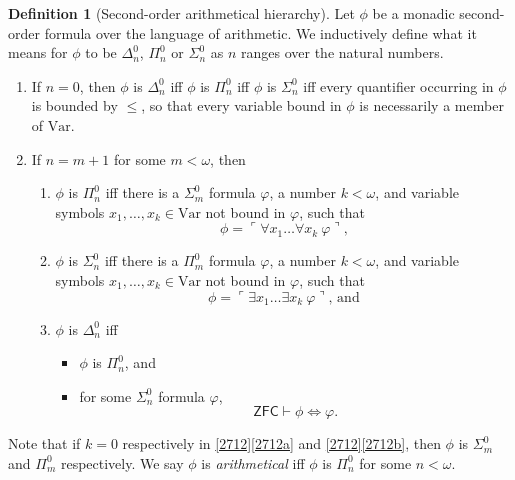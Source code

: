 \documentclass[12pt, twoside]{memoir}
\numberwithin{equation}{section}
\theoremstyle{definition}
\newtheorem{defi}[thm]{Definition}
\theoremstyle{remark}
\theoremstyle{definition}
\theoremstyle{definition}
\theoremstyle{definition}
\theoremstyle{remark}
\begin{document}
\begin{defi}[Second-order arithmetical hierarchy]\label{def2416}
Let $\phi$ be a monadic second-order formula over the language of arithmetic. We inductively define what it means for $\phi$ to be $\Delta^0_n$, $\Pi^0_n$ or $\Sigma^0_n$ as $n$ ranges over the natural numbers.
\begin{enumerate}[label=(\arabic*)]
    \item If $n = 0$, then $\phi$ is $\Delta^0_n$ iff $\phi$ is $\Pi^0_n$ iff $\phi$ is $\Sigma^0_n$ iff every quantifier occurring in $\phi$ is bounded by $\leq$, so that every variable bound in $\phi$ is necessarily a member of $\mathrm{Var}$.
    \item If $n = m + 1$ for some $m < \omega$, then 
    \begin{enumerate}[label=(\alph*)]
        \item $\phi$ is $\Pi^0_n$ iff there is a $\Sigma^0_m$ formula $\varphi$, a number $k < \omega$, and variable symbols $x_1, \dots, x_k \in \mathrm{Var}$ not bound in $\varphi$, such that 
        \begin{equation*}
            \phi = \ulcorner \forall x_1 \dots \forall x_k \ \varphi \urcorner \text{,}
        \end{equation*}
        \item $\phi$ is $\Sigma^0_n$ iff there is a $\Pi^0_m$ formula $\varphi$, a number $k < \omega$, and variable symbols $x_1, \dots, x_k \in \mathrm{Var}$ not bound in $\varphi$, such that 
        \begin{equation*}
            \phi = \ulcorner \exists x_1 \dots \exists x_k \ \varphi \urcorner \text{, and}
        \end{equation*}
        \item $\phi$ is $\Delta^0_n$ iff 
        \begin{itemize}[label=$\circ$]
            \item $\phi$ is $\Pi^0_n$, and
            \item for some $\Sigma^0_n$ formula $\varphi$,
            \begin{equation*}
                \mathsf{ZFC} \vdash \phi \iff \varphi \text{.}
            \end{equation*}
        \end{itemize}
    \end{enumerate}
\end{enumerate}
Note that if $k = 0$ respectively in \ref{2712}\ref{2712a} and \ref{2712}\ref{2712b}, then $\phi$ is $\Sigma^0_m$ and $\Pi^0_m$ respectively. We say $\phi$ is \emph{arithmetical} iff $\phi$ is $\Pi^0_n$ for some $n < \omega$.
\end{defi}
\end{document}
